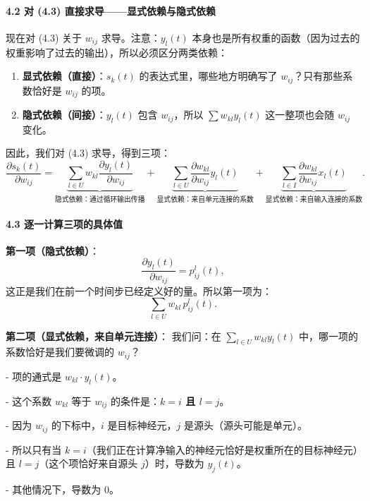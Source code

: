 \documentclass[journal,12pt,onecolumn]{IEEEtran}
\begin{document}
\paragraph{4.2 对 (4.3) 直接求导——显式依赖与隐式依赖}

现在对 (4.3) 关于 \(w_{ij}\) 求导。注意：\(y_l(t)\) 本身也是所有权重的函数（因为过去的权重影响了过去的输出），所以必须区分两类依赖：

\begin{enumerate}
    \item \textbf{显式依赖（直接）}：\(s_k(t)\) 的表达式里，哪些地方明确写了 \(w_{ij}\)？只有那些系数恰好是 \(w_{ij}\) 的项。
    \item \textbf{隐式依赖（间接）}：\(y_l(t)\) 包含 \(w_{ij}\)，所以 \(\sum w_{kl} y_l(t)\) 这一整项也会随 \(w_{ij}\) 变化。
\end{enumerate}

因此，我们对 (4.3) 求导，得到三项：
\[
\frac{\partial s_k(t)}{\partial w_{ij}} = 
\underbrace{\sum_{l \in U} w_{kl} \frac{\partial y_l(t)}{\partial w_{ij}}}_{\text{隐式依赖：通过循环输出传播}}
+
\underbrace{\sum_{l \in U} \frac{\partial w_{kl}}{\partial w_{ij}} y_l(t)}_{\text{显式依赖：来自单元连接的系数}}
+
\underbrace{\sum_{l \in I} \frac{\partial w_{kl}}{\partial w_{ij}} x_l(t)}_{\text{显式依赖：来自输入连接的系数}}. \tag{4.4}
\]

\paragraph{4.3 逐一计算三项的具体值}

\textbf{第一项（隐式依赖）}：
\[
\frac{\partial y_l(t)}{\partial w_{ij}} = p_{ij}^l(t),
\]
这正是我们在前一个时间步已经定义好的量。所以第一项为：
\[
\sum_{l \in U} w_{kl} \, p_{ij}^l(t). \tag{4.5}
\]

\textbf{第二项（显式依赖，来自单元连接）}：
我们问：在 \(\sum_{l \in U} w_{kl} y_l(t)\) 中，哪一项的系数恰好是我们要微调的 \(w_{ij}\)？

- 项的通式是 \(w_{kl} \cdot y_l(t)\)。

- 这个系数 \(w_{kl}\) 等于 \(w_{ij}\) 的条件是：\textbf{\(k = i\) 且 \(l = j\)}。

- 因为 \(w_{ij}\) 的下标中，\(i\) 是目标神经元，\(j\) 是源头（源头可能是单元）。

- 所以只有当 \(k=i\)（我们正在计算净输入的神经元恰好是权重所在的目标神经元）且 \(l=j\)（这个项恰好来自源头 \(j\)）时，导数为 \(y_j(t)\)。

- 其他情况下，导数为 0。
\end{document}
